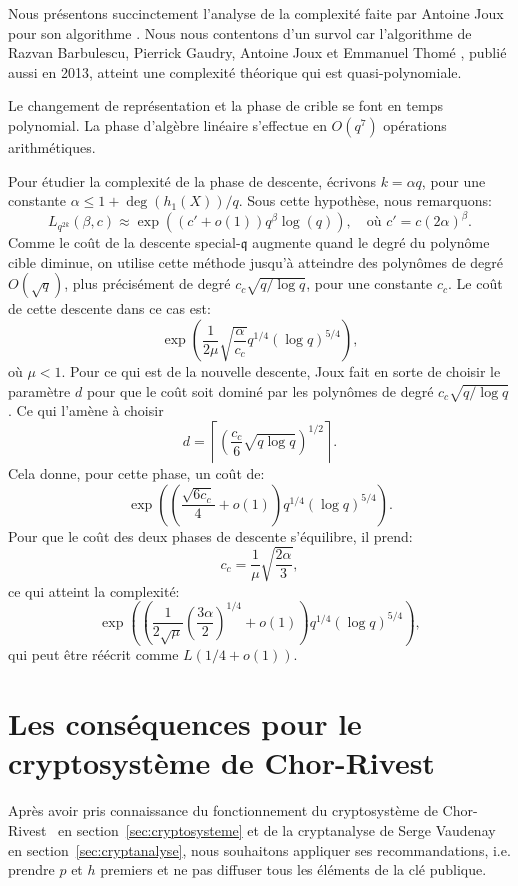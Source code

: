 \documentclass[a4paper, titlepage, 11pt]{article}
\theoremstyle{definition}
\theoremstyle{remark}
\def\O{O}
\def\o{o}
\def\ceil #1{\left\lceil#1\right\rceil}
\begin{document}
Nous présentons succinctement l'analyse de la complexité faite par Antoine Joux pour son algorithme \cite{joux2013}. Nous nous contentons d'un survol car l'algorithme de Razvan Barbulescu, Pierrick Gaudry, Antoine Joux et Emmanuel Thomé \cite{barbulescu2013}, publié aussi en 2013, atteint une complexité théorique qui est quasi-polynomiale.

Le changement de représentation et la phase de crible se font en temps polynomial. La phase d'algèbre linéaire s'effectue en $\O(q^7)$ opérations arithmétiques.

Pour étudier la complexité de la phase de descente, écrivons $k = \alpha q$, pour une constante $\alpha \leqslant 1 + \deg(h_1(X)) / q$. Sous cette hypothèse, nous remarquons:
$$L_{q^{2k}}(\beta, c) \approx \exp\left((c'+\o(1))q^\beta\log(q)\right),\quad\text{où } c' = c(2\alpha)^\beta.$$
Comme le coût de la descente special-$\mathfrak{q}$ augmente quand le degré du polynôme cible diminue, on utilise cette méthode jusqu'à atteindre des polynômes de degré $\O(\sqrt{q})$, plus précisément de degré $c_c\sqrt{q/\log q}$, pour une constante $c_c$. Le coût de cette descente dans ce cas est:
$$\exp\left(\frac{1}{2\mu}\sqrt{\frac{\alpha}{c_c}}q^{1/4}(\log q)^{5/4}\right),$$
où $\mu < 1$. Pour ce qui est de la nouvelle descente, Joux fait en sorte de choisir le paramètre $d$ pour que le coût soit dominé par les polynômes de degré $c_c\sqrt{q/\log q}$. Ce qui l'amène à choisir
$$d = \ceil{\left(\frac{c_c}{6}\sqrt{q\log q}\right)^{1/2}}.$$
Cela donne, pour cette phase, un coût de:
$$\exp\left(\left( \frac{\sqrt{6c_c}}{4} + \o(1)\right)q^{1/4}(\log q)^{5/4}\right).$$
Pour que le coût des deux phases de descente s'équilibre, il prend:
$$c_c = \frac{1}{\mu}\sqrt{\frac{2\alpha}{3}},$$
ce qui atteint la complexité:
$$\exp\left(\left(\frac{1}{2\sqrt{\mu}}{\left(\frac{3\alpha}{2}\right)}^{1/4}+\o(1)\right)q^{1/4}(\log q)^{5/4}\right),$$
qui peut être réécrit comme $L(1/4+\o(1))$.

\section{Les conséquences pour le cryptosystème de Chor-Rivest}\label{sec:consequences}

Après avoir pris connaissance du fonctionnement du cryptosystème de Chor-Rivest~\cite{chorRivest1988} en section~\ref{sec:cryptosysteme} et de la cryptanalyse de Serge Vaudenay~\cite{vaudenay2000} en section~\ref{sec:cryptanalyse}, nous souhaitons appliquer ses recommandations, i.e. prendre $p$ et $h$ premiers et ne pas diffuser tous les éléments de la clé publique.
\end{document}
